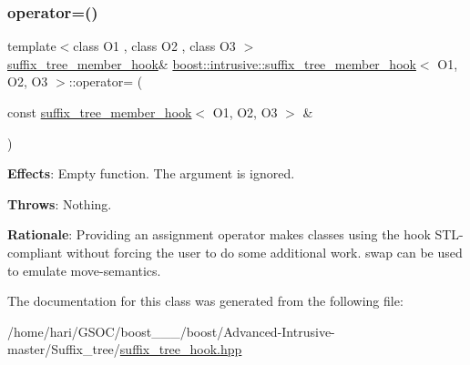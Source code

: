 \subsubsection{\texorpdfstring{operator=()}{operator=()}}
{\footnotesize\ttfamily template$<$class O1 , class O2 , class O3 $>$ \\
\hyperlink{classboost_1_1intrusive_1_1suffix__tree__member__hook}{suffix\+\_\+tree\+\_\+member\+\_\+hook}\& \hyperlink{classboost_1_1intrusive_1_1suffix__tree__member__hook}{boost\+::intrusive\+::suffix\+\_\+tree\+\_\+member\+\_\+hook}$<$ O1, O2, O3 $>$\+::operator= (\begin{DoxyParamCaption}\item[{const \hyperlink{classboost_1_1intrusive_1_1suffix__tree__member__hook}{suffix\+\_\+tree\+\_\+member\+\_\+hook}$<$ O1, O2, O3 $>$ \&}]{ }\end{DoxyParamCaption})}

{\bfseries Effects}\+: Empty function. The argument is ignored.

{\bfseries Throws}\+: Nothing.

{\bfseries Rationale}\+: Providing an assignment operator makes classes using the hook S\+T\+L-\/compliant without forcing the user to do some additional work. {\ttfamily swap} can be used to emulate move-\/semantics. 

The documentation for this class was generated from the following file\+:\begin{DoxyCompactItemize}
\item 
/home/hari/\+G\+S\+O\+C/boost\+\_\+\_\+\_/boost/\+Advanced-\/\+Intrusive-\/master/\+Suffix\+\_\+tree/\hyperlink{suffix__tree__hook_8hpp}{suffix\+\_\+tree\+\_\+hook.\+hpp}\end{DoxyCompactItemize}
